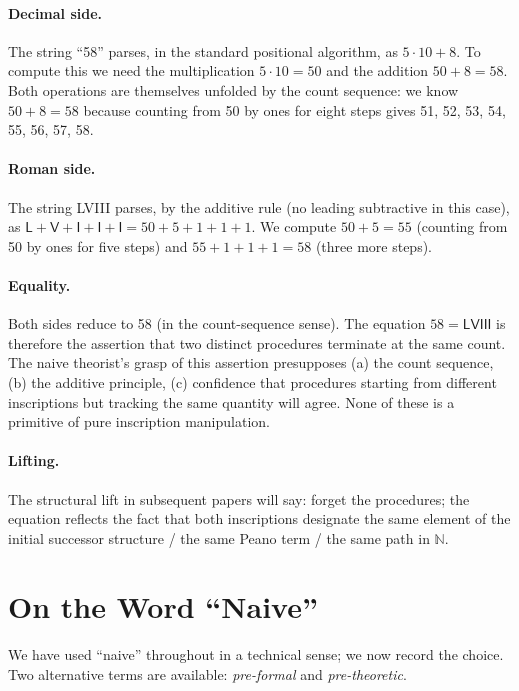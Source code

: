 \documentclass[12pt]{article}
\theoremstyle{definition}
\theoremstyle{remark}
\begin{document}
\paragraph{Decimal side.} The string ``58'' parses, in the standard
positional algorithm, as $5 \cdot 10 + 8$. To compute this we need the
multiplication $5 \cdot 10 = 50$ and the addition $50 + 8 = 58$. Both
operations are themselves unfolded by the count sequence: we know
$50 + 8 = 58$ because counting from 50 by ones for eight steps gives
51, 52, 53, 54, 55, 56, 57, 58.

\paragraph{Roman side.} The string \textsf{LVIII} parses, by the additive
rule (no leading subtractive in this case), as
$\mathsf{L} + \mathsf{V} + \mathsf{I} + \mathsf{I} + \mathsf{I} =
50 + 5 + 1 + 1 + 1$. We compute $50 + 5 = 55$ (counting from 50 by
ones for five steps) and $55 + 1 + 1 + 1 = 58$ (three more steps).

\paragraph{Equality.} Both sides reduce to 58 (in the count-sequence
sense). The equation $58 = \mathsf{LVIII}$ is therefore the assertion
that two distinct procedures terminate at the same count. The naive
theorist's grasp of this assertion presupposes (a) the count sequence,
(b) the additive principle, (c) confidence that procedures starting
from different inscriptions but tracking the same quantity will agree.
None of these is a primitive of pure inscription manipulation.

\paragraph{Lifting.} The structural lift in subsequent papers will say:
forget the procedures; the equation reflects the fact that both
inscriptions designate the same element of the initial successor
structure / the same Peano term / the same path in $\mathbb{N}$.

\section{On the Word ``Naive''}
\label{app:naive}

We have used ``naive'' throughout in a technical sense; we now record
the choice. Two alternative terms are available: \emph{pre-formal} and
\emph{pre-theoretic}.
\end{document}
